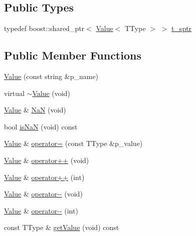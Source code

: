\subsection*{Public Types}
\begin{DoxyCompactItemize}
\item 
typedef boost\+::shared\+\_\+ptr$<$ \hyperlink{classxtd_1_1counters_1_1Value}{Value}$<$ T\+Type $>$ $>$ \hyperlink{classxtd_1_1counters_1_1Value_a24669b6d950db6c5c20546ce12a467cf}{t\+\_\+sptr}
\end{DoxyCompactItemize}
\subsection*{Public Member Functions}
\begin{DoxyCompactItemize}
\item 
\hyperlink{classxtd_1_1counters_1_1Value_a298f146ab57eaed8e6f783c26e78e0f4}{Value} (const string \&p\+\_\+name)
\item 
virtual \hyperlink{classxtd_1_1counters_1_1Value_a500d43a2cea3f654aa524959a7893e31}{$\sim$\+Value} (void)
\item 
\hyperlink{classxtd_1_1counters_1_1Value}{Value} \& \hyperlink{classxtd_1_1counters_1_1Value_ab206db077ef38ac776a7e64774f56f2b}{NaN} (void)
\item 
bool \hyperlink{classxtd_1_1counters_1_1Value_a6fab70b05b6e99db492e0a3d8a0d9fb6}{is\+NaN} (void) const 
\item 
\hyperlink{classxtd_1_1counters_1_1Value}{Value} \& \hyperlink{classxtd_1_1counters_1_1Value_a017667569f4177e0c44836ef4e9bc7b0}{operator=} (const T\+Type \&p\+\_\+value)
\item 
\hyperlink{classxtd_1_1counters_1_1Value}{Value} \& \hyperlink{classxtd_1_1counters_1_1Value_a8e7e5f0ff7388f18deaddf51e016c905}{operator++} (void)
\item 
\hyperlink{classxtd_1_1counters_1_1Value}{Value} \& \hyperlink{classxtd_1_1counters_1_1Value_a4a8989a7f9585998eb4210dfdd1b099e}{operator++} (int)
\item 
\hyperlink{classxtd_1_1counters_1_1Value}{Value} \& \hyperlink{classxtd_1_1counters_1_1Value_ac94ea7115378eb16dbef10d030b52a66}{operator-\/-\/} (void)
\item 
\hyperlink{classxtd_1_1counters_1_1Value}{Value} \& \hyperlink{classxtd_1_1counters_1_1Value_a9036f1b2a2904960e67c1faef11f1835}{operator-\/-\/} (int)
\item 
const T\+Type \& \hyperlink{classxtd_1_1counters_1_1Value_a459b2e9fc6974821968f5c05a62ec4ca}{get\+Value} (void) const 
\end{DoxyCompactItemize}
